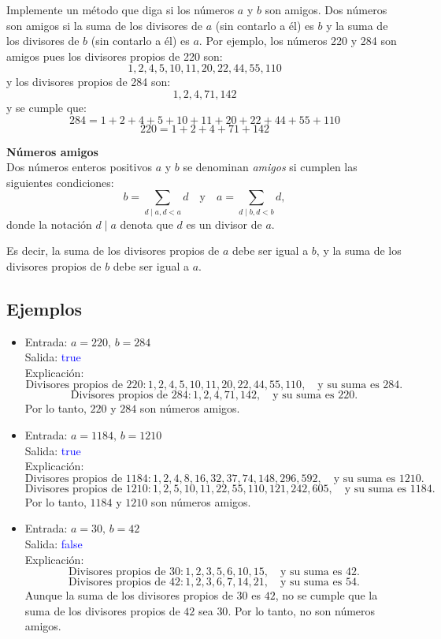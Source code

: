 Implemente un método que diga si los números $a$ y $b$ son amigos. Dos números son amigos si la suma de los divisores de $a$ (sin contarlo a él) es $b$ y la suma de los divisores de $b$ (sin contarlo a él) es $a$. Por ejemplo, los números 220 y 284 son amigos pues los divisores propios de 220 son:
\[
1, 2, 4, 5, 10, 11, 20, 22, 44, 55, 110
\]
y los divisores propios de 284 son:
\[
1, 2, 4, 71, 142
\]
y se cumple que:
\[
284 = 1 + 2 + 4 + 5 + 10 + 11 + 20 + 22 + 44 + 55 + 110
\]
\[
220 = 1 + 2 + 4 + 71 + 142
\]

\item \textbf{Números amigos}\\
Dos números enteros positivos \( a \) y \( b \) se denominan \textit{amigos} si cumplen las siguientes condiciones:
\[
b = \sum_{d \mid a, d < a}d \quad \text{y} \quad a = \sum_{d \mid b, d < b} d,
\]
donde la notación \( d \mid a \) denota que \( d \) es un divisor de \( a \). 

Es decir, la suma de los divisores propios de \( a \) debe ser igual a \( b \), y la suma de los divisores propios de \( b \) debe ser igual a \( a \).

\subsection*{Ejemplos}
\begin{itemize}
    \item Entrada: \( a = 220, \, b = 284 \)\\
    Salida: \textcolor{blue}{true}\\
    Explicación:
    \[
    \text{Divisores propios de } 220: 1, 2, 4, 5, 10, 11, 20, 22, 44, 55, 110, \quad \text{y su suma es } 284.
    \]
    \[
    \text{Divisores propios de } 284: 1, 2, 4, 71, 142, \quad \text{y su suma es } 220.
    \]
    Por lo tanto, \( 220 \) y \( 284 \) son números amigos.

    \item Entrada: \( a = 1184, \, b = 1210 \)\\
    Salida: \textcolor{blue}{true}\\
    Explicación:
    \[
    \text{Divisores propios de } 1184: 1, 2, 4, 8, 16, 32, 37, 74, 148, 296, 592, \quad \text{y su suma es } 1210.
    \]
    \[
    \text{Divisores propios de } 1210: 1, 2, 5, 10, 11, 22, 55, 110, 121, 242, 605, \quad \text{y su suma es } 1184.
    \]
    Por lo tanto, \( 1184 \) y \( 1210 \) son números amigos.

    \item Entrada: \( a = 30, \, b = 42 \)\\
    Salida: \textcolor{blue}{false}\\
    Explicación:
    \[
    \text{Divisores propios de } 30: 1, 2, 3, 5, 6, 10, 15, \quad \text{y su suma es } 42.
    \]
    \[
    \text{Divisores propios de } 42: 1, 2, 3, 6, 7, 14, 21, \quad \text{y su suma es } 54.
    \]
    Aunque la suma de los divisores propios de \( 30 \) es \( 42 \), no se cumple que la suma de los divisores propios de \( 42 \) sea \( 30 \). Por lo tanto, no son números amigos.
\end{itemize}
